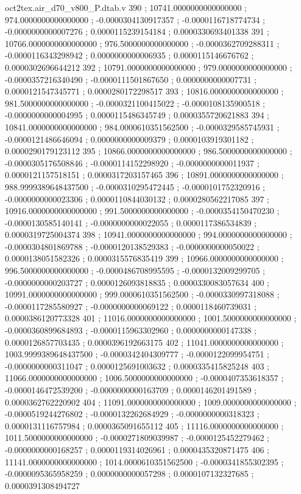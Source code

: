 \begin{filecontents}[overwrite]{oct2tex.air_d70_v800_P.dtab.v}
390 ; 10741.0000000000000000 ; 974.0000000000000000 ; -0.0000304130917357 ; -0.0000116718774734 ; -0.0000000000007276 ; 0.0000115239154184 ; 0.0000330693401338
391 ; 10766.0000000000000000 ; 976.5000000000000000 ; -0.0000362709288311 ; -0.0000116343298942 ; 0.0000000000006935 ; 0.0000115146676762 ; 0.0000302696644212
392 ; 10791.0000000000000000 ; 979.0000000000000000 ; -0.0000357216340490 ; -0.0000111501867650 ; 0.0000000000007731 ; 0.0000121547345771 ; 0.0000280172298517
393 ; 10816.0000000000000000 ; 981.5000000000000000 ; -0.0000321100415022 ; -0.0000108135900518 ; -0.0000000000004995 ; 0.0000115486345749 ; 0.0000355720621883
394 ; 10841.0000000000000000 ; 984.0000610351562500 ; -0.0000329585745931 ; -0.0000121486646094 ; 0.0000000000009379 ; 0.0000103919301182 ; 0.0000290179123112
395 ; 10866.0000000000000000 ; 986.5000000000000000 ; -0.0000305176508846 ; -0.0000114152298920 ; -0.0000000000011937 ; 0.0000121157518151 ; 0.0000317203157465
396 ; 10891.0000000000000000 ; 988.9999389648437500 ; -0.0000310295472445 ; -0.0000101752320916 ; -0.0000000000023306 ; 0.0000110844030132 ; 0.0000280562217085
397 ; 10916.0000000000000000 ; 991.5000000000000000 ; -0.0000354150470230 ; -0.0000130585140141 ; -0.0000000000022055 ; 0.0000117386534839 ; 0.0000319725004374
398 ; 10941.0000000000000000 ; 994.0000000000000000 ; -0.0000304801869788 ; -0.0000120138529383 ; -0.0000000000050022 ; 0.0000138051582326 ; 0.0000315576835419
399 ; 10966.0000000000000000 ; 996.5000000000000000 ; -0.0000486708995595 ; -0.0000132009299705 ; -0.0000000000203727 ; 0.0000126093818835 ; 0.0000330083057634
400 ; 10991.0000000000000000 ; 999.0000610351562500 ; -0.0000330997318088 ; -0.0000117285580927 ; -0.0000000000069122 ; 0.0000118460739031 ; 0.0000386120773328
401 ; 11016.0000000000000000 ; 1001.5000000000000000 ; -0.0000360899684893 ; -0.0000115963302960 ; 0.0000000000147338 ; 0.0000126857703435 ; 0.0000396192663175
402 ; 11041.0000000000000000 ; 1003.9999389648437500 ; -0.0000342404309777 ; -0.0000122099954751 ; -0.0000000000311047 ; 0.0000125691003632 ; 0.0000335415825248
403 ; 11066.0000000000000000 ; 1006.5000000000000000 ; -0.0000407353618357 ; -0.0000146472539200 ; -0.0000000000163709 ; 0.0000146201491589 ; 0.0000362762220902
404 ; 11091.0000000000000000 ; 1009.0000000000000000 ; -0.0000519244276802 ; -0.0000132262684929 ; -0.0000000000318323 ; 0.0000131116757984 ; 0.0000365091655112
405 ; 11116.0000000000000000 ; 1011.5000000000000000 ; -0.0000271809039987 ; -0.0000125452279462 ; -0.0000000000168257 ; 0.0000119314026961 ; 0.0000435320871475
406 ; 11141.0000000000000000 ; 1014.0000610351562500 ; -0.0000341855302395 ; -0.0000095365958259 ; 0.0000000000057298 ; 0.0000107132327685 ; 0.0000391308494727

\end{filecontents}
